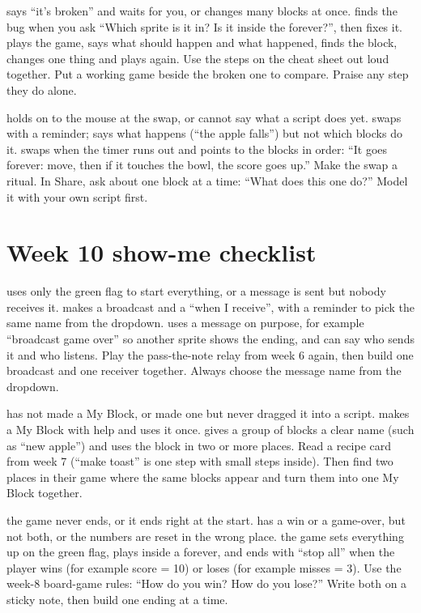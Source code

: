   {says \enquote{it's broken} and waits for you, or changes many blocks at once.}
  {finds the bug when you ask \enquote{Which sprite is it in? Is it inside the forever?}, then fixes it.}
  {plays the game, says what should happen and what happened, finds the block, changes one thing and plays again.}
  {Use the steps on the cheat sheet out loud together. Put a working game beside the broken one to compare. Praise any step they do alone.}

  {holds on to the mouse at the swap, or cannot say what a script does yet.}
  {swaps with a reminder; says what happens (\enquote{the apple falls}) but not which blocks do it.}
  {swaps when the timer runs out and points to the blocks in order: \enquote{It goes forever: move, then if it touches the bowl, the score goes up.}}
  {Make the swap a ritual. In Share, ask about one block at a time: \enquote{What does this one do?} Model it with your own script first.}

\section{Week 10 show-me checklist}

  {uses only the green flag to start everything, or a message is sent but nobody receives it.}
  {makes a broadcast and a \enquote{when I receive}, with a reminder to pick the same name from the dropdown.}
  {uses a message on purpose, for example \enquote{broadcast game over} so another sprite shows the ending, and can say who sends it and who listens.}
  {Play the pass-the-note relay from week 6 again, then build one broadcast and one receiver together. Always choose the message name from the dropdown.}

  {has not made a My Block, or made one but never dragged it into a script.}
  {makes a My Block with help and uses it once.}
  {gives a group of blocks a clear name (such as \enquote{new apple}) and uses the block in two or more places.}
  {Read a recipe card from week 7 (\enquote{make toast} is one step with small steps inside). Then find two places in their game where the same blocks appear and turn them into one My Block together.}

  {the game never ends, or it ends right at the start.}
  {has a win or a game-over, but not both, or the numbers are reset in the wrong place.}
  {the game sets everything up on the green flag, plays inside a forever, and ends with \enquote{stop all} when the player wins (for example score = 10) or loses (for example misses = 3).}
  {Use the week-8 board-game rules: \enquote{How do you win? How do you lose?} Write both on a sticky note, then build one ending at a time.}

